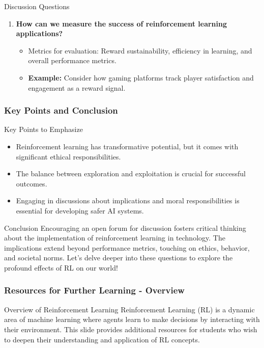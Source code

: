 \documentclass[aspectratio=169]{beamer}
\begin{document}
\begin{frame}[fragile]
\begin{block}{Discussion Questions}
\begin{enumerate}
      \item \textbf{How can we measure the success of reinforcement learning applications?}
        \begin{itemize}
          \item Metrics for evaluation: Reward sustainability, efficiency in learning, and overall performance metrics.
          \item \textbf{Example:} Consider how gaming platforms track player satisfaction and engagement as a reward signal.
        \end{itemize}
    \end{enumerate}
  \end{block}
\end{frame}

\begin{frame}[fragile]
  \frametitle{Key Points and Conclusion}
  \begin{block}{Key Points to Emphasize}
    \begin{itemize}
      \item Reinforcement learning has transformative potential, but it comes with significant ethical responsibilities.
      \item The balance between exploration and exploitation is crucial for successful outcomes.
      \item Engaging in discussions about implications and moral responsibilities is essential for developing safer AI systems.
    \end{itemize}
  \end{block}

  \begin{block}{Conclusion}
    Encouraging an open forum for discussion fosters critical thinking about the implementation of reinforcement learning in technology. The implications extend beyond performance metrics, touching on ethics, behavior, and societal norms. Let’s delve deeper into these questions to explore the profound effects of RL on our world!
  \end{block}
\end{frame}

\begin{frame}[fragile]
    \frametitle{Resources for Further Learning - Overview}
    \begin{block}{Overview of Reinforcement Learning}
        Reinforcement Learning (RL) is a dynamic area of machine learning where agents learn to make decisions by interacting with their environment. This slide provides additional resources for students who wish to deepen their understanding and application of RL concepts.
    \end{block}
\end{frame}
\end{document}
